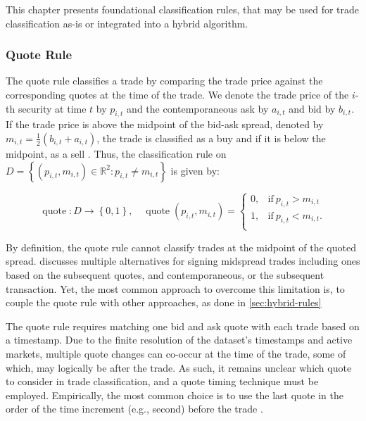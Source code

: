 This chapter presents foundational classification rules, that may be used for trade classification as-is or integrated into a hybrid algorithm.

\subsubsection{Quote Rule}\label{sec:quote-rule}

The quote rule classifies a trade by comparing the trade price against the corresponding quotes at the time of the trade. We denote the trade price of the $i$-th security at time $t$ by $p_{i,t}$ and the contemporaneous ask by $a_{i,t}$ and bid by $b_{i,t}$. If the trade price is above the midpoint of the bid-ask spread, denoted by $m_{i,t} = \tfrac{1}{2}(b_{i,t} + a_{i,t})$, the trade is classified as a buy and if it is below the midpoint, as a sell \autocite[][41]{harrisDayEndTransactionPrice1989}. Thus, the classification rule on $D = \left\{(p_{i,t}, m_{i,t}) \in \mathbb{R}^2: p_{i,t} \neq m_{i,t}\right\}$ is given by:

\begin{equation}
  \operatorname{quote}\colon D \to \left\{0, 1\right\},\quad
  \operatorname{quote}(p_{i,t}, m_{i,t})=
  \begin{cases}
    0, & \text{if}\ p_{i, t}>m_{i, t}  \\
    1, & \text{if}\ p_{i, t}<m_{i, t}. \\
  \end{cases}
\end{equation}

By definition, the quote rule cannot classify trades at the midpoint of the quoted spread. \textcite[][241]{hasbrouckTradesQuotesInventories1988} discusses multiple alternatives for signing midspread trades including ones based on the subsequent quotes, and contemporaneous, or the subsequent transaction. Yet, the most common approach to overcome this limitation is, to couple the quote rule with other approaches, as done in \cref{sec:hybrid-rules}

The quote rule requires matching one bid and ask quote with each trade based on a timestamp. Due to the finite resolution of the dataset's timestamps and active markets, multiple quote changes can co-occur at the time of the trade, some of which, may logically be after the trade. As such, it remains unclear which quote to consider in trade classification, and a quote timing technique must be employed. Empirically, the most common choice is to use the last quote in the order of the time increment (e.g., second) before the trade \autocite[][1765]{holdenLiquidityMeasurementProblems2014}.

